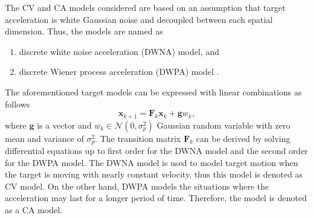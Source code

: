 \documentclass[english, 12pt, a4paper, elec, utf8, a-1b, online]{aaltothesis}
\renewcommand{\vec}[1]{\mathbf{#1}}
\newcommand{\normal}[2]{\mathcal{N}\left(#1, #2 \right)}
\begin{document}
The CV and CA models considered are based on an assumption that target acceleration is white Gaussian noise and decoupled between each spatial dimension.
Thus, the models are named as
\begin{enumerate}
    \item discrete white noise acceleration (DWNA) model, and
    \item discrete Wiener process acceleration (DWPA) model \cite{BarShalom2001}.
\end{enumerate}
The aforementioned target models can be expressed with linear combinations as follows 
\begin{equation}
    \vec{x}_{k+1} = \mathbf{F}_k \vec{x}_k + \vec{g} w_k,
\end{equation}
where $\vec{g}$ is a vector and $w_k \in \normal{0}{\sigma_p^2}$ Gaussian random variable with zero mean and variance of $\sigma_p^2$.
The transition matrix $\mathbf{F}_k$ can be derived by solving differential equations up to first order for the DWNA model and the second order for the DWPA model.
The DWNA model is used to model target motion when the target is moving with nearly constant velocity, thus this model is denoted as CV model.
On the other hand, DWPA models the situations where the acceleration may last for a longer period of time. 
Therefore, the model is denoted as a CA model.
\end{document}
